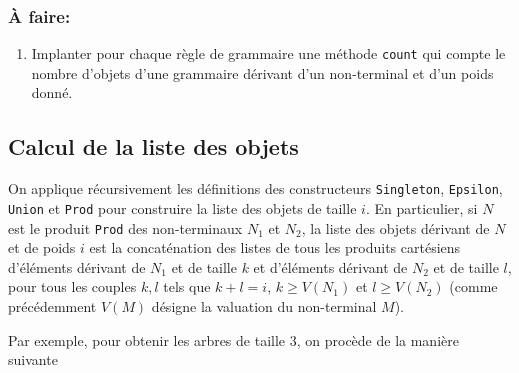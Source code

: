 \documentclass[11pt]{article}
\newcounter{asuivre}
\newenvironment{asks}{\begin{enumerate}\setcounter{enumi}{\theasuivre}}%
                       {\setcounter{asuivre}{\theenumi}\end{enumerate}}
\begin{document}
\subsubsection{À faire:}
\begin{asks}
\item Implanter pour chaque règle de grammaire une méthode
  \texttt{count} qui compte le nombre d'objets d'une grammaire dérivant
  d'un non-terminal et d'un poids donné.
\end{asks}


\subsection{Calcul de la liste des objets}

On applique récursivement les définitions des constructeurs
\texttt{Singleton}, \texttt{Epsilon}, \texttt{Union} et \texttt{Prod} pour
construire la liste des objets de taille $i$. En particulier, si $N$ est le
produit \texttt{Prod} des non-terminaux $N_1$ et $N_2$, la liste des objets
dérivant de $N$ et de poids $i$ est la concaténation des listes de tous les
produits cartésiens d'éléments dérivant de $N_1$ et de taille $k$ et
d'éléments dérivant de $N_2$ et de taille $l$, pour tous les couples $k,l$
tels que $k+l=i$, $k \geq V(N_1)$ et $l \geq V(N_2)$ (comme précédemment
$V(M)$ désigne la valuation du non-terminal $M$).

Par exemple, pour obtenir les arbres de taille $3$, on procède de la manière
suivante
\end{document}
